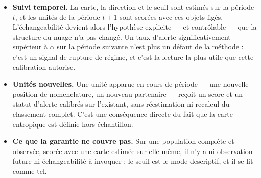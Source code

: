 \documentclass[11pt,a4paper]{article}
\theoremstyle{definition}
\theoremstyle{remark}
\begin{document}
\begin{itemize}[nosep,leftmargin=1.4em]
  \item \textbf{Suivi temporel.} La carte, la direction et le seuil sont estimés sur la
  période $t$, et les unités de la période $t+1$ sont scorées avec ces objets figés.
  L'échangeabilité devient alors l'hypothèse explicite --- et contrôlable --- que la
  structure du nuage n'a pas changé. Un taux d'alerte significativement supérieur à
  $\alpha$ sur la période suivante n'est plus un défaut de la méthode : c'est un signal de
  rupture de régime, et c'est la lecture la plus utile que cette calibration autorise.
  \item \textbf{Unités nouvelles.} Une unité apparue en cours de période --- une nouvelle
  position de nomenclature, un nouveau partenaire --- reçoit un score et un statut d'alerte
  calibrés sur l'existant, sans réestimation ni recalcul du classement complet. C'est une
  conséquence directe du fait que la carte entropique est définie hors échantillon.
  \item \textbf{Ce que la garantie ne couvre pas.} Sur une population complète et observée,
  scorée avec une carte estimée sur elle-même, il n'y a ni observation future ni
  échangeabilité à invoquer : le seuil est le mode descriptif, et il se lit comme tel.
\end{itemize}

\bigskip
\end{document}
